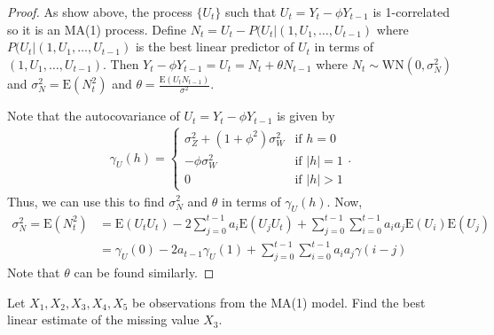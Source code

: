 \documentclass[12pt]{article}
\theoremstyle{definition}
\newenvironment{custompbm}[1]
  {\renewcommand\theproblem{#1}\problem}
  {\endproblem}
\newcommand{\E}{\text{E}}
\begin{document}
\begin{proof}
  As show above, the process $\{U_t\}$ such that $U_t = Y_t - \phi Y_{t-1}$ is
  1-correlated so it is an MA(1) process. Define $N_t = U_t - P(U_t|(1, U_1, \dots, U_{t-1})$ where
  $P(U_t|(1, U_1, \dots, U_{t-1})$ is the best linear predictor of $U_t$ in terms of
  $(1, U_1, \dots, U_{t-1})$. Then $Y_t - \phi Y_{t-1} = U_t = N_t + \theta N_{t-1}$ where $N_t \sim \text{WN}(0, \sigma_N^2)$
  and $\sigma_N^2 = \E(N_t^2)$ and $\theta = \frac{\E(U_tN_{t-1})}{\sigma^2}$.

  Note that the autocovariance of $U_t = Y_t - \phi Y_{t-1}$ is given by
  \begin{align*}
  \gamma_U(h) =
  \begin{cases}
    \sigma_Z^2 + (1 + \phi^2)\sigma_W^2 & \text{if $h = 0$} \\
    -\phi\sigma_W^2 & \text{if $|h| = 1$} \\
    0 & \text{if $|h| > 1$}
  \end{cases}.
  \end{align*}
  Thus, we can use this to find $\sigma_N^2$ and $\theta$ in terms of $\gamma_U(h)$.
  Now,
  \begin{align*}
    \sigma_N^2 = \E(N_t^2) &= \E(U_tU_t) - 2 \sum_{j=0}^{t-1} a_i \E(U_jU_t) + \sum_{j=0}^{t-1}\sum_{i=0}^{t-1}a_i a_j \E(U_i)\E(U_j)\\
    &= \gamma_U(0) - 2a_{t-1} \gamma_U(1) + \sum_{j=0}^{t-1}\sum_{i=0}^{t-1}a_i a_j \gamma(i-j)
  \end{align*}
  Note that $\theta$ can be found similarly.
\end{proof}

\begin{custompbm}{4.a}
  Let $X_1, X_2, X_3, X_4, X_5$ be observations from the MA(1) model.
  Find the best linear estimate of the missing value $X_3$.
\end{custompbm}
\end{document}
